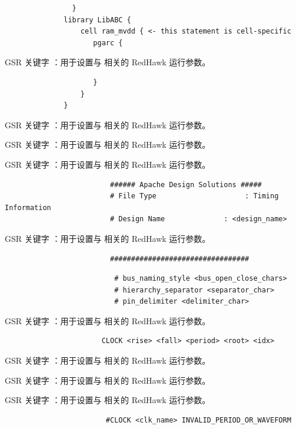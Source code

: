\begin{lstlisting}
                }
              library LibABC {
                  cell ram_mvdd { <- this statement is cell-specific
                     pgarc {
\end{lstlisting}

GSR 关键字 ：用于设置与  相关的 RedHawk 运行参数。

\begin{lstlisting}
                     }
                  }
              }
\end{lstlisting}

GSR 关键字 ：用于设置与  相关的 RedHawk 运行参数。

GSR 关键字 ：用于设置与  相关的 RedHawk 运行参数。

GSR 关键字 ：用于设置与  相关的 RedHawk 运行参数。

\begin{lstlisting}
                         ###### Apache Design Solutions #####
                         # File Type                     : Timing Information
                         # Design Name              : <design_name>
\end{lstlisting}

GSR 关键字 ：用于设置与  相关的 RedHawk 运行参数。

\begin{lstlisting}
                         #################################
\end{lstlisting}

\begin{lstlisting}
                          # bus_naming_style <bus_open_close_chars>
                          # hierarchy_separator <separator_char>
                          # pin_delimiter <delimiter_char>
\end{lstlisting}

GSR 关键字 ：用于设置与  相关的 RedHawk 运行参数。

\begin{lstlisting}
                       CLOCK <rise> <fall> <period> <root> <idx>
\end{lstlisting}

GSR 关键字 ：用于设置与  相关的 RedHawk 运行参数。

GSR 关键字 ：用于设置与  相关的 RedHawk 运行参数。

GSR 关键字 ：用于设置与  相关的 RedHawk 运行参数。

\begin{lstlisting}
                        #CLOCK <clk_name> INVALID_PERIOD_OR_WAVEFORM
\end{lstlisting}

